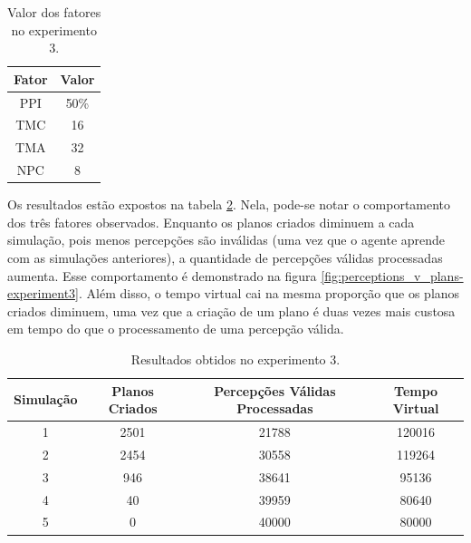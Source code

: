 \begin{table}[h!]
    \begin{center}
        \caption{ Valor dos fatores no experimento 3. }
        \label{table:experiment3factors}
        \begin{tabular}{ |c|c| }
            \hline
            \textbf{Fator} & \textbf{Valor}\\
            \hline
            PPI & 50\%\\
            \hline
            TMC & 16\\
            \hline
            TMA & 32\\
            \hline
            NPC & 8\\
            \hline
        \end{tabular}{}
    \end{center}{}
\end{table}

Os resultados estão expostos na tabela \ref{table:experiment3results}. Nela, pode-se notar o comportamento dos três fatores observados. Enquanto os planos criados diminuem a cada simulação, pois menos percepções são inválidas (uma vez que o agente aprende com as simulações anteriores), a quantidade de percepções válidas processadas aumenta. Esse comportamento é demonstrado na figura \ref{fig:perceptions_v_plans-experiment3}. Além disso, o tempo virtual cai na mesma proporção que os planos criados diminuem, uma vez que a criação de um plano é duas vezes mais custosa em tempo do que o processamento de uma percepção válida.

\begin{table}
    \begin{center}
        \caption{ Resultados obtidos no experimento 3. }
        \label{table:experiment3results}
        \begin{tabular}{ |c|c|c|c| }
            \hline
            \textbf{Simulação} & \textbf{Planos Criados} & \textbf{Percepções Válidas Processadas} & \textbf{Tempo Virtual}\\
            \hline
            1 & 2501 & 21788 & 120016 \\
            \hline
            2 & 2454 & 30558 & 119264 \\
            \hline
            3 & 946 & 38641 & 95136 \\
            \hline
            4 & 40 & 39959 & 80640 \\
            \hline
            5 & 0 & 40000 & 80000 \\
            \hline
        \end{tabular}{}
    \end{center}{}
\end{table}



